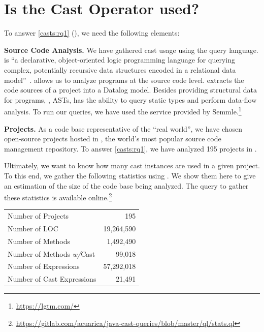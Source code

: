 \section{Is the Cast Operator used?}
\label{sec:casts:stats}

\newcommand{\nproject}{195}
\newcommand{\nloc}{19,264,590}
\newcommand{\nmethod}{1,492,490}
\newcommand{\nmethodwithcast}{99,018}
\newcommand{\nexpr}{57,292,018}
\newcommand{\nCastExpr}{21,491}


To answer \ref{casts:rq1} (\emph{\crqA}),
we need the following elements:

\textbf{Source Code Analysis.}
We have gathered cast usage using the \ql{} query language.
\ql{} is ``a declarative, object-oriented logic programming language for querying complex, potentially recursive data structures encoded in a relational data model''~\citep{avgustinovQLObjectorientedQueries2016}.
\ql{} allows us to analyze programs at the source code level.
\ql{} extracts the code sources of a project into a Datalog model.
Besides providing structural data for programs, \ie{}, ASTs, \ql{} has the ability to query static types and perform data-flow analysis.
To run our \ql{} queries, we have used the service provided by Semmle.\footnote{\url{https://lgtm.com/}} 

\textbf{Projects.} 
As a code base representative of the ``real world'',
we have chosen open-source projects hosted in \github{},
the world's most popular source code management repository.
To answer \ref{casts:rq1}, we have analyzed \nproject{} \java{} projects in \lgtm{}.

Ultimately, we want to know how many cast instances are used in a given project.
To this end, we gather the following statistics using \ql{}.
We show them here to give an estimation of the size of the code base being analyzed.
The query to gather these statistics is available online.\footnote{\url{https://gitlab.com/acuarica/java-cast-queries/blob/master/ql/stats.ql}}

\begin{center}
\begin{tabular}{lr}
	\hline
	Number of Projects & \nproject \\
	Number of LOC & \nloc{} \\
	Number of Methods & \nmethod \\
	Number of Methods \emph{w/}Cast & \nmethodwithcast \\
    Number of Expressions & \nexpr \\
    Number of Cast Expressions & \nCastExpr \\
	\hline
\end{tabular}
\end{center}

